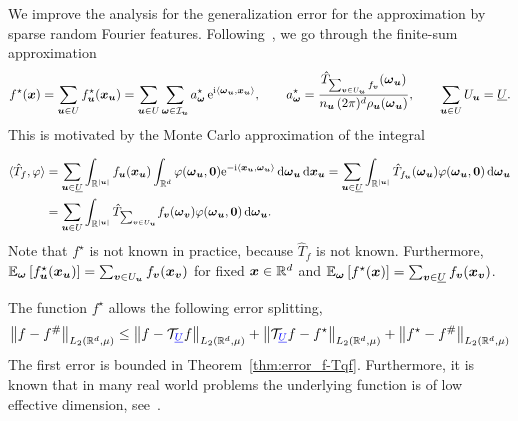 \documentclass{article}
\renewcommand{\vec}[1]{\ensuremath \mathbf{\boldsymbol{#1}}}
\newcommand{\X}{\ensuremath{\mathcal{X}}}
\renewcommand{\phi}{\varphi}
\newcommand{\w}{\ensuremath{\vec \omega}}
\newcommand{\x}{\ensuremath{\vec x}}
\newcommand{\I}{\ensuremath{\mathcal{I}}}
\newcommand{\R}{\ensuremath{\mathbb{R}}}
\newcommand{\E}{\ensuremath{\mathbb{E}}}
\newcommand{\dx}{\mathrm{d}}
\newcommand{\e}{\mathrm{e}}
\newcommand{\im}{\mathrm{i}}
\renewcommand{\d}{\, \mathrm{d}}
\newcommand{\norm}[1]{\left\lVert {#1} \right\rVert}    %
\newcommand{\TT}{\mathcal T}				%
\theoremstyle{definition}
\numberwithin{equation}{section}
\begin{document}
\par
We improve the analysis for the generalization error for the approximation by sparse random Fourier features. Following~\cite{Ha23,Xie22,HARFE23}, we go through the finite-sum approximation 
\begin{equation}\label{eq:f_star}
f^{\star}(\x) = \sum_{\vec u \in U} f^\star_{\vec u}(\x_{\vec u}) =\sum_{\vec u \in U}\sum_{\w\in \I_{\vec u}} a_{\w}^{\star} \, \e^{\im\langle \w_{\vec u},\x_{\vec u}\rangle},
\quad \quad a_{\w}^{\star} = \frac{\hat{T}_{\sum_{\vec v\in U_{\vec u}}f_{\vec v}}(\w_{\vec u})}{n_{\vec u} \,(2\pi)^d \rho_{\vec u}(\w_{\vec u})}, \quad \quad \sum_{\vec u\in U} U_{\vec u} = \underline U.
\end{equation}
This is motivated by the Monte Carlo approximation of the integral

\begin{align*}
\langle \hat T_f ,\phi\rangle
&= \sum_{\vec u\in \underline U} \int_{\R^{|\vec u|}} f_{\vec u} (\x_{\vec u}) \int_{\R^d} \phi(\w_{\vec u},\vec 0) \e^{-\im \langle \x_{\vec u},\w_{\vec u}\rangle} \d \w_{\vec u}  \d \x_{\vec u} 
= \sum_{\vec u\in \underline U}  \int_{\R^{|\vec u|}}  \hat T_{f_{\vec u}}(\w_{\vec u})   \phi(\w_{\vec u},\vec 0) \d \w_{\vec u}\\
&=\sum_{\vec u\in  U}  \int_{\R^{|\vec u|}}  \hat T_{\sum_{\vec v\in U_{\vec u}}}f_{\vec v}(\w_{\vec v})   \phi(\w_{\vec u},\vec 0) \d \w_{\vec u}.
\end{align*}%
Note that $f^\star$ is not known in practice, because $\hat{T}_{f}$ is not known. Furthermore, $\E_{\w} \left[f^\star_{\vec u}(\vec x_{\vec u})\right] = \sum_{\vec v\in U_{\vec u}}f_{\vec v}(\vec x_{\vec v})$ for fixed $\vec x\in \R^d$ and $\E_{\w} \left[f^\star(\vec x)\right] = \sum_{\vec v\in \underline{U}}f_{\vec v}(\vec x_{\vec v})$.%
\par


The function $f^\star$ allows the following error splitting,
\begin{equation}\label{eq:error_split}
\norm{f-f^\#}_{L_2(\R^d,\mu)} \leq \norm{f-\TT_{\color{blue}\underline U} f}_{L_2(\R^d,\mu)} + \norm{\TT_{\color{blue}\underline U} f - f^\star}_{L_2(\R^d,\mu)} + \norm{f^\star -f^\#}_{L_2(\R^d,\mu)} 
\end{equation}
The first error is bounded in Theorem~\ref{thm:error_f-Tqf}. Furthermore, it is known that in many real world problems the underlying function is of low effective dimension, see~\cite{CaMoOw97, DePeVo10, KuSlWaWo09}. \par
\end{document}
